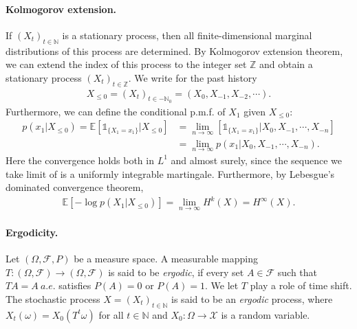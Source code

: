 \documentclass{article}
\numberwithin{equation}{section}
\newcommand{\E}{\mathbb{E}}
\newcommand{\bbN}{\mathbb{N}}
\newcommand{\bbZ}{\mathbb{Z}}
\newcommand{\scr}{\mathscr}
\renewcommand{\cal}{\mathcal}
\theoremstyle{plain}
\theoremstyle{definition}
\begin{document}
\paragraph{Kolmogorov extension.} If $(X_t)_{t\in\bbN}$ is a stationary process, then all finite-dimensional marginal distributions of this process are determined. By Kolmogorov extension theorem, we can extend the index of this process to the integer set $\bbZ$ and obtain a stationary process $(X_t)_{t\in\bbZ}$. We write for the past history
\begin{align*}
	X_{\leq 0}=(X_t)_{t\in-\bbN_0}=(X_0,X_{-1},X_{-2},\cdots).
\end{align*}
Furthermore, we can define the conditional p.m.f. of $X_1$ given $X_{\leq 0}$:
\begin{align*}
	p(x_1|X_{\leq 0})=\E\left[\mathds{1}_{\{X_1=x_1\}}|X_{\leq 0}\right]&=\lim_{n\to\infty}\left[\mathds{1}_{\{X_1=x_1\}}|X_0,X_{-1},\cdots,X_{-n}\right]\\
	&=\lim_{n\to\infty}p(x_1|X_0,X_{-1},\cdots,X_{-n}).
\end{align*}
Here the convergence holds both in $L^1$ and almost surely, since the sequence we take limit of is a uniformly integrable martingale. Furthermore, by Lebesgue's dominated convergence theorem,
\begin{align*}
	\E\left[-\log p(X_1|X_{\leq 0})\right]=\lim_{n\to\infty}H^k(X)=H^\infty(X).
\end{align*}

\paragraph{Ergodicity.} Let $(\Omega,\mathscr{F},P)$ be a measure space. A measurable mapping $T:(\Omega,\mathscr{F})\to(\Omega,\mathscr{F})$ is said to be \textit{ergodic}, if every set $A\in\scr{F}$ such that $TA=A\ a.e.$ satisfies $P(A)=0$ or $P(A)=1$. We let $T$ play a role of time shift. The stochastic process $X=(X_t)_{t\in\bbN}$ is said to be an \textit{ergodic} process, where $X_t(\omega)=X_0(T^t\omega)$ for all $t\in\bbN$ and $X_0:\Omega\to\cal{X}$ is a random variable.
\end{document}
